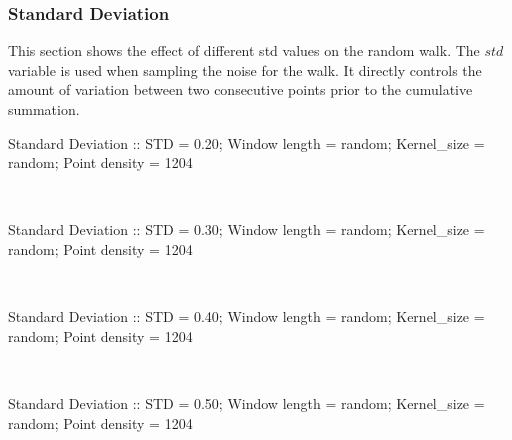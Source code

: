 \documentclass[AMA,LATO1COL]{WileyNJD-v2}
\begin{document}
\subsubsection{Standard Deviation}\label{standard-deviation}\raggedright
This section shows the effect of different std values on the random walk. The \(std\) variable is used when sampling the noise for the walk. It directly controls the amount of variation between two consecutive points prior to the cumulative summation.

    \newpage 
    \begin{center} 
Standard Deviation :: STD = 0.20; Window length = random; Kernel\_size = random; Point density = 1204


    \begin{center}
    \end{center}
    { \hspace*{\fill} \\}
    
    \newpage 
Standard Deviation :: STD = 0.30; Window length = random; Kernel\_size = random; Point density = 1204

    \begin{center}
    \end{center}
    { \hspace*{\fill} \\}
    
    \newpage 
Standard Deviation :: STD = 0.40; Window length = random; Kernel\_size = random; Point density = 1204


    \begin{center}
    \end{center}
    { \hspace*{\fill} \\}
    
    \newpage 
Standard Deviation :: STD = 0.50; Window length = random; Kernel\_size = random; Point density = 1204


    \begin{center}
    \end{center}
    { \hspace*{\fill} \\}
\end{center}
    
\end{document}
